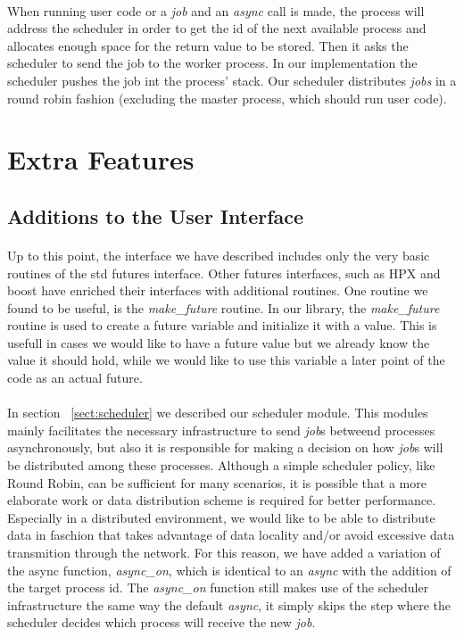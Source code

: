 \paragraph{}
When running user code or a \emph{job} and an \emph{async} call is made, the process will address the scheduler in order
to get the id of the next available process and allocates enough space for the return value to be stored.
Then it asks the scheduler to send the job to the worker process.  In our implementation the scheduler 
pushes the job int the process' stack.  Our scheduler distributes \emph{jobs} in a round robin fashion 
(excluding the master process, which should run user code). 

\section{Extra Features}

\subsection{Additions to the User Interface}
\paragraph{}
Up to this point, the interface we have described includes only the very basic routines of the std futures interface.
Other futures interfaces, such as HPX and boost have enriched their interfaces with additional routines.  One routine
we found to be useful, is the \emph{make\_future} routine.  In our library, the \emph{make\_future} routine is used
to create a future variable and initialize it with a value.  This is usefull in cases we would like to have a future
value but we already know the value it should hold, while we would like to use this variable a later point of the code
as an actual future.

\paragraph{}
In section ~\ref{sect:scheduler} we described our scheduler module.  This modules mainly facilitates the necessary 
infrastructure to send \emph{job}s betweend processes asynchronously, but also it is responsible for making a decision
on how \emph{job}s will be distributed among these processes.  Although a simple scheduler policy, like Round Robin, 
can be sufficient for many scenarios, it is possible that a more elaborate work or data distribution scheme is required
for better performance.  Especially in a distributed environment, we would like to be able to distribute data in faschion
that takes advantage of data locality and/or avoid excessive data transmition through the network.  For this reason, we
have added a variation of the async function, \emph{async\_on}, which is identical to an \emph{async} with the addition of
the target process id.  The \emph{async\_on} function still makes use of the scheduler infrastructure the same way
the default \emph{async}, it simply skips the step where the scheduler decides which process will receive the new 
\emph{job}.

